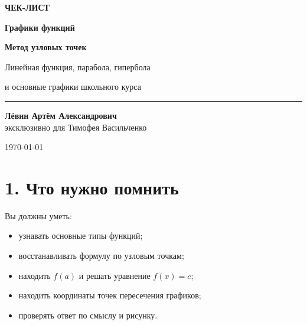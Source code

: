 \documentclass[a4paper,12pt]{article}
\begin{document}
\begin{titlepage}
\thispagestyle{empty}
\begin{center}
\vspace*{30mm}

{\Large\textcolor{softgray}{\textbf{ЧЕК-ЛИСТ}}}

\vspace{10mm}

{\Huge\textbf{\textcolor{darkaccent}{Графики функций}}}

\vspace{5mm}

{\Large\textbf{Метод узловых точек}}

\vspace{5mm}

{\large Линейная функция, парабола, гипербола\par
и основные графики школьного курса}

\vspace{18mm}

{\color{lightaccent}\rule{0.65\linewidth}{1pt}}

\vspace{18mm}

{\large
\textbf{Лёвин Артём Александрович}\\[2mm]
эксклюзивно для Тимофея Васильченко}

\vfill

{\large \today}
\end{center}

\end{titlepage}

\section*{\textcolor{darkaccent}{1. Что нужно помнить}}

Вы должны уметь:

\begin{itemize}
  \item узнавать основные типы функций;
  \item восстанавливать формулу по узловым точкам;
  \item находить $f(a)$ и решать уравнение $f(x)=c$;
  \item находить координаты точек пересечения графиков;
  \item проверять ответ по смыслу и рисунку.
\end{itemize}
\end{document}
